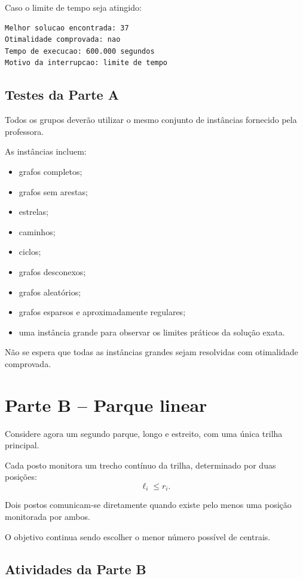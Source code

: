 \documentclass[11pt,a4paper]{article}
\begin{document}
Caso o limite de tempo seja atingido:

\begin{lstlisting}
Melhor solucao encontrada: 37
Otimalidade comprovada: nao
Tempo de execucao: 600.000 segundos
Motivo da interrupcao: limite de tempo
\end{lstlisting}

\subsection{Testes da Parte A}

Todos os grupos deverão utilizar o mesmo conjunto de instâncias fornecido pela professora.

As instâncias incluem:

\begin{itemize}
    \item grafos completos;
    \item grafos sem arestas;
    \item estrelas;
    \item caminhos;
    \item ciclos;
    \item grafos desconexos;
    \item grafos aleatórios;
    \item grafos esparsos e aproximadamente regulares;
    \item uma instância grande para observar os limites práticos da solução exata.
\end{itemize}

Não se espera que todas as instâncias grandes sejam resolvidas com otimalidade comprovada.

\section{Parte B -- Parque linear}

Considere agora um segundo parque, longo e estreito, com uma única trilha principal.

Cada posto monitora um trecho contínuo da trilha, determinado por duas posições:
\[
\ell_i \leq r_i.
\]

Dois postos comunicam-se diretamente quando existe pelo menos uma posição monitorada por ambos.

O objetivo continua sendo escolher o menor número possível de centrais.

\subsection{Atividades da Parte B}
\end{document}
